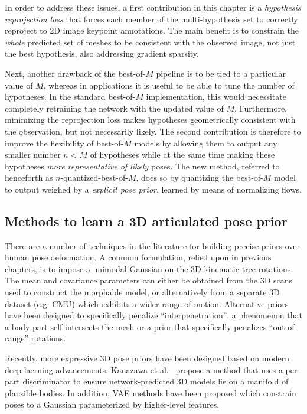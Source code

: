 In order to address these issues, a first contribution in this chapter is a \emph{hypothesis reprojection loss} that forces each member of the multi-hypothesis set to correctly reproject to 2D image keypoint annotations.
The main benefit is to constrain the \emph{whole} predicted set of meshes to be consistent with the observed image, not just the best hypothesis, also addressing gradient sparsity.

Next, another drawback of the best-of-{$M$} pipeline is to be tied to a particular value of $M$, whereas in applications it is useful to be able to tune the number of hypotheses. In the standard best-of-{$M$} implementation, this would necessitate completely retraining the network with the updated value of $M$. 
Furthermore, minimizing the reprojection loss makes hypotheses geometrically consistent with the observation, but not necessarily likely.
The second contribution is therefore to improve the flexibility of best-of-$M$ models by allowing them to output any smaller number $n<M$ of hypotheses while at the same time making these hypotheses \emph{more representative of likely} poses.
The new method, referred to henceforth as $n$-quantized-best-of-$M$, does so by quantizing the best-of-$M$ model to output weighed by a \emph{explicit pose prior}, learned by means of normalizing flows.

\subsection{Methods to learn a 3D articulated pose prior}


There are a number of techniques in the literature for building precise priors over human pose deformation. A common formulation, relied upon in previous chapters, is to impose a unimodal Gaussian on the 3D kinematic tree rotations. The mean and covariance parameters can either be obtained from the 3D scans used to construct the morphable model, or alternatively from a separate 3D dataset (e.g. CMU) which exhibits a wider range of motion. Alternative priors have been designed to specifically penalize ``interpenetration'', a phenomenon that a body part self-intersects the mesh or a prior that specifically penalizes ``out-of-range'' rotations. 

Recently, more expressive 3D pose priors have been designed based on modern deep laerning advancements. Kanazawa et al.~\cite{xxx} propose a method that uses a per-part discriminator to ensure network-predicted 3D models lie on a manifold of plausible bodies. In addition, VAE methods have been proposed which constrain poses to a Gaussian parameterized by higher-level features. %

